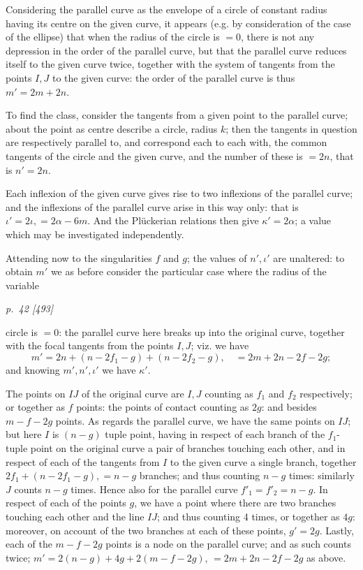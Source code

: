 ﻿\documentclass[11pt,a4paper]{article}
\theoremstyle{plain}
\theoremstyle{definition}
\begin{document}
Considering the parallel curve as the envelope of a circle of constant
radius having its centre on the given curve, it appears (e.g. by
consideration of the case of the ellipse) that when the radius of the
circle is \(=0\), there is not any depression in the order of the parallel
curve, but that the parallel curve reduces itself to the given curve twice,
together with the system of tangents from the points \(I,J\) to the given
curve: the order of the parallel curve is thus \(m'=2m+2n\).

To find the class, consider the tangents from a given point to the parallel
curve; about the point as centre describe a circle, radius \(k\); then the
tangents in question are respectively parallel to, and correspond each to
each with, the common tangents of the circle and the given curve, and the
number of these is \(=2n\), that is \(n'=2n\).

Each inflexion of the given curve gives rise to two inflexions of the
parallel curve; and the inflexions of the parallel curve arise in this way
only: that is \(\iota'=2\iota,=2\alpha-6m\). And the Pl\"uckerian relations
then give \(\kappa'=2\alpha\); a value which may be investigated
independently.

Attending now to the singularities \(f\) and \(g\); the values of
\(n',\iota'\) are unaltered: to obtain \(m'\) we as before consider the
particular case where the radius of the variable

\textit{p.~42 [493]}

circle is \(=0\): the parallel curve here breaks up into the original
curve, together with the focal tangents from the points \(I,J\); viz. we
have
\[
m'=2n+(n-2f_1-g)+(n-2f_2-g),\quad =2m+2n-2f-2g;
\]
and knowing \(m',n',\iota'\) we have \(\kappa'\).

The points on \(IJ\) of the original curve are \(I,J\) counting as
\(f_1\) and \(f_2\) respectively; or together as \(f\) points: the points
of contact counting as \(2g\): and besides \(m-f-2g\) points. As regards
the parallel curve, we have the same points on \(IJ\); but here \(I\) is
\((n-g)\) tuple point, having in respect of each branch of the
\(f_1\)-tuple point on the original curve a pair of branches touching each
other, and in respect of each of the tangents from \(I\) to the given
curve a single branch, together \(2f_1+(n-2f_1-g),=n-g\) branches; and
thus counting \(n-g\) times: similarly \(J\) counts \(n-g\) times. Hence
also for the parallel curve \(f'_1=f'_2=n-g\). In respect of each of the
points \(g\), we have a point where there are two branches touching each
other and the line \(IJ\); and thus counting 4 times, or together as
\(4g\): moreover, on account of the two branches at each of these points,
\(g'=2g\). Lastly, each of the \(m-f-2g\) points is a node on the parallel
curve; and as such counts twice; \(m'=2(n-g)+4g+2(m-f-2g)\),
\(=2m+2n-2f-2g\) as above.
\end{document}
